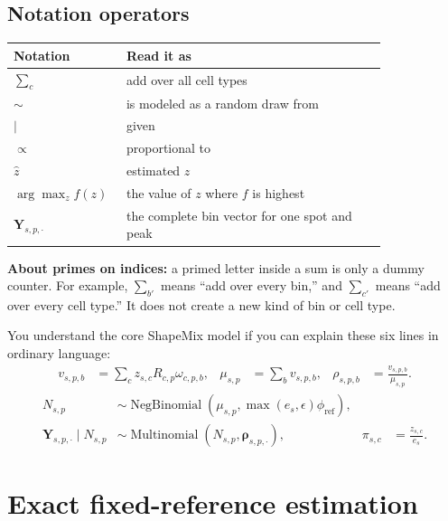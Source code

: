 \documentclass[11pt]{article}
\newcommand{\NB}{\operatorname{NegBinomial}}
\newcommand{\Mult}{\operatorname{Multinomial}}
\begin{document}
\subsection*{Notation operators}

\begin{center}
\begin{tabular}{C{0.18\linewidth}L{0.64\linewidth}}
\toprule
Notation & Read it as \\
\midrule
\(\sum_c\) & add over all cell types \\
\(\sim\) & is modeled as a random draw from \\
\(\mid\) & given \\
\(\propto\) & proportional to \\
\(\widehat z\) & estimated \(z\) \\
\(\arg\max_z f(z)\) & the value of \(z\) where \(f\) is highest \\
\(\boldsymbol Y_{s,p,\boldsymbol\cdot}\) & the complete bin vector for one spot and peak \\
\bottomrule
\end{tabular}
\end{center}

\textbf{About primes on indices:} a primed letter inside a sum is only a dummy
counter. For example, \(\sum_{b'}\) means “add over every bin,” and
\(\sum_{c'}\) means “add over every cell type.” It does not create a new kind of
bin or cell type.

\begin{checkpoint}
You understand the core ShapeMix model if you can explain these six lines in
ordinary language:
\[
\begin{aligned}
v_{s,p,b}&=\sum_cz_{s,c}R_{c,p}\omega_{c,p,b}, &
\mu_{s,p}&=\sum_bv_{s,p,b}, &
\rho_{s,p,b}&=\frac{v_{s,p,b}}{\mu_{s,p}}.
\end{aligned}
\]
\[
\begin{aligned}
N_{s,p}&\sim\NB\!\left(\mu_{s,p},\max(e_s,\epsilon)\phi_{\mathrm{ref}}\right),\\
\boldsymbol Y_{s,p,\cdot}\mid N_{s,p}
&\sim\Mult(N_{s,p},\boldsymbol\rho_{s,p,\cdot}),
& \pi_{s,c}&=\frac{z_{s,c}}{e_s}.
\end{aligned}
\]
\end{checkpoint}

\appendix

\section{Exact fixed-reference estimation}
\label{app:reference}
\end{document}
